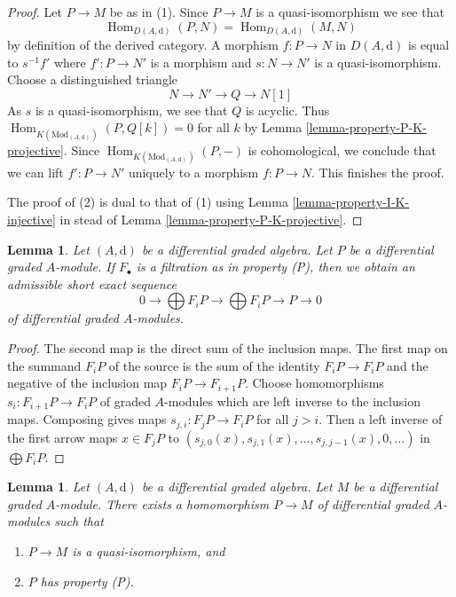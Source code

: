 \documentclass{stacks-project}
\theoremstyle{plain}
\newtheorem{lemma}[subsection]{Lemma}
\theoremstyle{definition}
\theoremstyle{remark}
\numberwithin{equation}{subsection}
\def\Hom{\mathop{\mathrm{Hom}}\nolimits}
\begin{document}
\begin{proof}
Let $P \to M$ be as in (1). Since $P \to M$ is a quasi-isomorphism we see that
$$
\Hom_{D(A, \text{d})}(P, N) = \Hom_{D(A, \text{d})}(M, N)
$$
by definition of the derived category. A morphism
$f : P \to N$ in $D(A, \text{d})$ is equal to
$s^{-1}f'$ where $f' : P \to N'$ is a morphism and
$s : N \to N'$ is a quasi-isomorphism. Choose a distinguished triangle
$$
N \to N' \to Q \to N[1]
$$
As $s$ is a quasi-isomorphism, we see that $Q$ is acyclic. Thus
$\Hom_{K(\text{Mod}_{(A, \text{d})})}(P, Q[k]) = 0$ for all $k$ by
Lemma \ref{lemma-property-P-K-projective}. Since
$\Hom_{K(\text{Mod}_{(A, \text{d})})}(P, -)$
is cohomological, we conclude that we can lift $f' : P \to N'$
uniquely to a morphism $f : P \to N$. This finishes the proof.

\medskip\noindent
The proof of (2) is dual to that of (1) using
Lemma \ref{lemma-property-I-K-injective} in stead of
Lemma \ref{lemma-property-P-K-projective}.
\end{proof}

\begin{lemma}
\label{lemma-property-P-sequence}
Let $(A, \text{d})$ be a differential graded algebra.
Let $P$ be a differential graded $A$-module. If $F_\bullet$
is a filtration as in property (P), then we obtain an
admissible short exact sequence
$$
0 \to
\bigoplus\nolimits F_iP \to
\bigoplus\nolimits F_iP \to P \to 0
$$
of differential graded $A$-modules.
\end{lemma}

\begin{proof}
The second map is the direct sum of the inclusion maps.
The first map on the summand $F_iP$ of the source is the sum
of the identity $F_iP \to F_iP$ and the negative of the inclusion
map $F_iP \to F_{i + 1}P$. Choose homomorphisms $s_i : F_{i + 1}P \to F_iP$
of graded $A$-modules which are left inverse to the inclusion maps.
Composing gives maps $s_{j, i} : F_jP \to F_iP$ for all $j > i$.
Then a left inverse of the first arrow maps $x \in F_jP$ to
$(s_{j, 0}(x), s_{j, 1}(x), \ldots, s_{j, j - 1}(x), 0, \ldots)$
in $\bigoplus F_iP$.
\end{proof}

\begin{lemma}
\label{lemma-resolve}
Let $(A, \text{d})$ be a differential graded algebra.
Let $M$ be a differential graded $A$-module. There exists a homomorphism
$P \to M$ of differential graded $A$-modules such that
\begin{enumerate}
\item $P \to M$ is a quasi-isomorphism, and
\item $P$ has property (P).
\end{enumerate}
\end{lemma}
\end{document}
